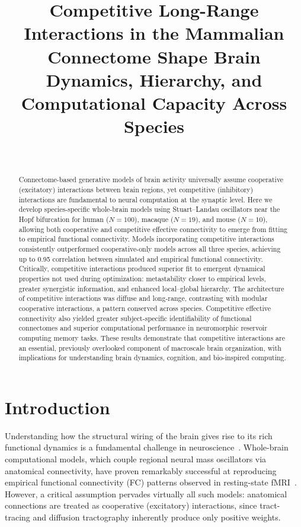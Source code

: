 \documentclass[11pt]{article}
\title{Competitive Long-Range Interactions in the Mammalian Connectome Shape Brain Dynamics, Hierarchy, and Computational Capacity Across Species}
\author{~}
\date{}
\begin{document}
\maketitle

\begin{abstract}
Connectome-based generative models of brain activity universally assume cooperative (excitatory) interactions between brain regions, yet competitive (inhibitory) interactions are fundamental to neural computation at the synaptic level.  Here we develop species-specific whole-brain models using Stuart--Landau oscillators near the Hopf bifurcation for human ($N=100$), macaque ($N=19$), and mouse ($N=10$), allowing both cooperative and competitive effective connectivity to emerge from fitting to empirical functional connectivity.  Models incorporating competitive interactions consistently outperformed cooperative-only models across all three species, achieving up to 0.95 correlation between simulated and empirical functional connectivity.  Critically, competitive interactions produced superior fit to emergent dynamical properties not used during optimization: metastability closer to empirical levels, greater synergistic information, and enhanced local--global hierarchy.  The architecture of competitive interactions was diffuse and long-range, contrasting with modular cooperative interactions, a pattern conserved across species.  Competitive effective connectivity also yielded greater subject-specific identifiability of functional connectomes and superior computational performance in neuromorphic reservoir computing memory tasks.  These results demonstrate that competitive interactions are an essential, previously overlooked component of macroscale brain organization, with implications for understanding brain dynamics, cognition, and bio-inspired computing.
\end{abstract}

\section{Introduction}

Understanding how the structural wiring of the brain gives rise to its rich functional dynamics is a fundamental challenge in neuroscience~\citep{sporns2005human,honey2009predicting,breakspear2017dynamic}.  Whole-brain computational models, which couple regional neural mass oscillators via anatomical connectivity, have proven remarkably successful at reproducing empirical functional connectivity (FC) patterns observed in resting-state fMRI~\citep{deco2011emerging,deco2014great,deco2018wholeBrain}.  However, a critical assumption pervades virtually all such models: anatomical connections are treated as cooperative (excitatory) interactions, since tract-tracing and diffusion tractography inherently produce only positive weights.
\end{document}
